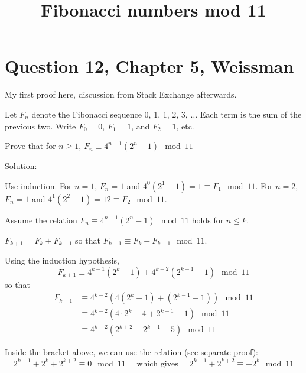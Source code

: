 \documentclass[11pt]{amsart}
\title{Fibonacci numbers mod 11}
\author{}
\begin{document}
\maketitle

\section{Question 12, Chapter 5, Weissman}

My first proof here, discussion from Stack Exchange afterwards.

Let $F_n$ denote the Fibonacci sequence 0, 1, 1, 2, 3, $\ldots$ Each term is the sum of the previous two. Write $F_0 = 0$, $F_1 = 1$, and $F_2 = 1$, etc. 

Prove that for $n \ge 1$, $F_n \equiv 4^{n-1} (2^{n} - 1) \mod 11$ 

\vspace{2em}

Solution:

\vspace{1em}

Use induction. For $n=1$, $F_{n} = 1$ and $4^{0}(2^{1}-1)=1 \equiv F_{1} \mod 11$. For $n=2$, $F_{n} = 1$ and $4^{1}(2^{2}-1) = 12 \equiv F_{2} \mod 11$.


Assume the relation $F_n \equiv 4^{n-1} (2^{n} - 1) \mod 11$ holds for $n \le k$.

$F_{k+1} = F_{k} + F_{k-1}$ so that $F_{k+1} \equiv F_{k} + F_{k-1} \mod 11$.

Using the induction hypothesis, 
$$
F_{k+1} \equiv 
4^{k-1} (2^{k} - 1) 
+
4^{k-2} (2^{k-1} - 1) 
\mod 11
$$
so that
$$
\begin{aligned}
F_{k+1} 
&\equiv 
4^{k-2} 
\left(
4 (2^{k} - 1) 
+
(2^{k-1} - 1) 
\right)
\mod 11
\\
&\equiv 
4^{k-2} 
\left(
4 \cdot 2^{k} - 4 
+
2^{k-1} - 1
\right)
\mod 11
\\
&\equiv 
4^{k-2} 
\left(
2^{k+2}  
+
2^{k-1} - 5
\right)
\mod 11
\end{aligned}
$$

Inside the bracket above, we can use the relation 
(see separate proof):
$$
2^{k-1} + 2^{k} + 2^{k+2} \equiv 0 \mod 11 
\quad \text{ which gives } \quad
2^{k-1} +  2^{k+2} \equiv - 2^{k} \mod 11 
$$
 
\end{document}

